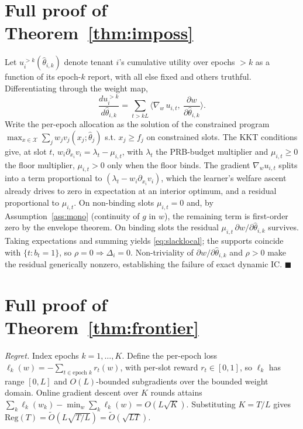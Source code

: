 \documentclass[conference]{IEEEtran}
\theoremstyle{definition}
\theoremstyle{remark}
\newcommand{\Slots}{T}
\newcommand{\Ep}{L}
\newcommand{\Neps}{K}
\newcommand{\rhobind}{\rho}
\newcommand{\type}{\theta}
\newcommand{\alloc}{x}
\newcommand{\allocsp}{\mathcal{X}}
\newcommand{\wt}{w}
\newcommand{\val}{v}
\newcommand{\flo}{f}
\newcommand{\bindind}{b}
\newcommand{\Reg}{\mathrm{Reg}}
\newcommand{\Slack}{\Delta}
\newcommand{\Otil}{\tilde{O}}
\begin{document}
\appendices

\section{Full proof of Theorem~\ref{thm:imposs}}\label{app:imposs}
Let $u_i^{>k}(\hat\type_{i,k})$ denote tenant $i$'s cumulative utility over epochs $>k$ as a function of its epoch-$k$ report, with all else fixed and others truthful. Differentiating through the weight map,
\[
\frac{d u_i^{>k}}{d\hat\type_{i,k}}=\sum_{t>kL}\Big\langle\nabla_{\wt}\,u_{i,t},\ \frac{\partial\wt}{\partial\hat\type_{i,k}}\Big\rangle .
\]
Write the per-epoch allocation as the solution of the constrained program $\max_{\alloc\in\allocsp}\sum_j\wt_j\val_j(\alloc_j;\hat\type_j)$ s.t. $\alloc_{j}\ge\flo_j$ on constrained slots. The KKT conditions give, at slot $t$, $\wt_i\partial_{\alloc_i}\val_i=\lambda_t-\mu_{i,t}$, with $\lambda_t$ the PRB-budget multiplier and $\mu_{i,t}\ge0$ the floor multiplier, $\mu_{i,t}>0$ only when the floor binds. The gradient $\nabla_{\wt}u_{i,t}$ splits into a term proportional to $(\lambda_t-\wt_i\partial_{\alloc_i}\val_i)$, which the learner's welfare ascent already drives to zero in expectation at an interior optimum, and a residual proportional to $\mu_{i,t}$. On non-binding slots $\mu_{i,t}=0$ and, by Assumption~\ref{ass:mono} (continuity of $g$ in $\wt$), the remaining term is first-order zero by the envelope theorem. On binding slots the residual $\mu_{i,t}\,\partial\wt/\partial\hat\type_{i,k}$ survives. Taking expectations and summing yields \eqref{eq:slacklocal}; the supports coincide with $\{t:\bindind_t=1\}$, so $\rhobind=0\Rightarrow\Slack_i=0$. Non-triviality of $\partial\wt/\partial\hat\type_{i,k}$ and $\rhobind>0$ make the residual generically nonzero, establishing the failure of exact dynamic IC. \hfill$\blacksquare$

\section{Full proof of Theorem~\ref{thm:frontier}}\label{app:frontier}
\emph{Regret.} Index epochs $k=1,\dots,\Neps$. Define the per-epoch loss $\ell_k(\wt)=-\sum_{t\in\text{epoch }k}r_t(\wt)$, with per-slot reward $r_t\in[0,1]$, so $\ell_k$ has range $[0,\Ep]$ and $O(\Ep)$-bounded subgradients over the bounded weight domain. Online gradient descent over $\Neps$ rounds attains $\sum_k\ell_k(\wt_k)-\min_{\wt}\sum_k\ell_k(\wt)=O(\Ep\sqrt{\Neps})$. Substituting $\Neps=\Slots/\Ep$ gives $\Reg(\Slots)=\Otil(\Ep\sqrt{\Slots/\Ep})=\Otil(\sqrt{\Ep\Slots})$.
\end{document}
